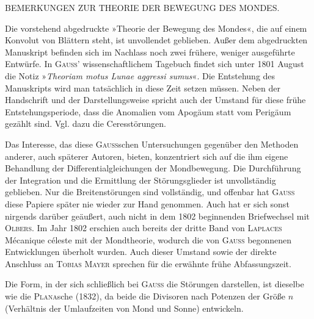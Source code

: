 \clearpage
\begingroup
\fancyhead[L]{}
\renewcommand{\headrulewidth}{0pt}
\begin{center}\large BEMERKUNGEN ZUR THEORIE DER BEWEGUNG DES MONDES.\end{center}

\par\noindent\hspace*{\parindent}Die vorstehend abgedruckte »Theorie der Bewegung des Mondes«, die auf einem Konvolut von
Blättern steht, ist unvollendet geblieben. Außer dem abgedruckten Manuskript befinden sich im Nachlass noch zwei
frühere, weniger ausgeführte Entwürfe. In \textsc{Gauss}’ wissenschaftlichem Tagebuch findet sich unter 1801
August die Notiz »\textit{Theoriam motus Lunae aggressi sumus}«. Die Entstehung des Manuskripts wird man
tatsächlich in diese Zeit setzen müssen. Neben der Handschrift und der Darstellungsweise spricht auch der
Umstand für diese frühe Entstehungsperiode, dass die Anomalien vom Apogäum statt vom Perigäum gezählt
sind. Vgl. dazu die Ceresstörungen.

\par\noindent\hspace*{\parindent}Das Interesse, das diese \textsc{Gauss}schen Untersuchungen gegenüber den Methoden anderer, auch späterer
Autoren, bieten, konzentriert sich auf die ihm eigene Behandlung der Differentialgleichungen der Mondbewegung.
Die Durchführung der Integration und die Ermittlung der Störungsglieder ist unvollständig
geblieben. Nur die Breitenstörungen sind vollständig, und offenbar hat \textsc{Gauss} diese Papiere später nie
wieder zur Hand genommen. Auch hat er sich sonst nirgends darüber geäußert, auch nicht in dem 1802
beginnenden Briefwechsel mit \textsc{Olbers}. Im Jahr 1802 erschien auch bereits der dritte Band von \textsc{Laplaces}
Mécanique céleste mit der Mondtheorie, wodurch die von \textsc{Gauss} begonnenen Entwicklungen überholt
wurden. Auch dieser Umstand sowie der direkte Anschluss an \textsc{Tobias Mayer} sprechen für die erwähnte
frühe Abfassungszeit.

\par\noindent\hspace*{\parindent}Die Form, in der sich schließlich bei \textsc{Gauss} die Störungen darstellen, ist dieselbe wie die \textsc{Plana}sche
(1832), da beide die Divisoren nach Potenzen der Größe \(n\) (Verhältnis der Umlaufzeiten von Mond und
Sonne) entwickeln.

